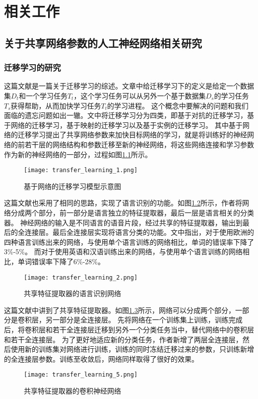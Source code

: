 
\chapter{相关工作}

\section{关于共享网络参数的人工神经网络相关研究}
\subsection{迁移学习的研究}

这篇文献\cite{10.1007/978-3-030-01424-7_27}是一篇关于迁移学习的综述。文章中给迁移学习下的定义是给定一个数据集$D_t$和一个学习任务$T_t$，这个学习任务可以从另外一个基于数据集$D_s$的学习任务$T_s$获得帮助，从而加快学习任务$T_t$的学习进程。
这个概念中要解决的问题和我们面临的遗忘问题如出一辙。文中将迁移学习分为四类，即基于对抗的迁移学习，基于网络的迁移学习，基于映射的迁移学习以及基于实例的迁移学习。
其中基于网络的迁移学习提出了共享网络参数来加快目标网络的学习，就是将训练好的神经网络的前若干层的网络结构和参数迁移至新的神经网络，将这些网络连接和学习参数作为新的神经网络的一部分，过程如图\ref{fig:transfer_learning_1}所示。
\begin{figure}
    \centering
    \texttt{[image: transfer\_learning\_1.png]}
    \caption{基于网络的迁移学习模型示意图\cite{10.1007/978-3-030-01424-7_27}}
    \label{fig:transfer_learning_1}
\end{figure}

这篇文献\cite{6639081}也采用了相同的思路，实现了语言识别的功能。如图\ref{fig:transfer_learning_2}所示，作者将网络分成两个部分，前一部分是语言独立的特征提取器，最后一层是语言相关的分类器。
神经网络的输入是不同语言的语音片段，经过共享的特征提取器，输出到最后的全连接层。最后全连接层实现将语言分类的功能。文中指出，对于使用欧洲的四种语言训练出来的网络，与使用单个语言训练的网络相比，单词的错误率下降了3\%-5\%。
而对于使用英语和汉语训练出来的网络，与使用单个语言训练的网络相比，单词错误率下降了6\%-28\%。
\begin{figure}
    \centering
    \texttt{[image: transfer\_learning\_2.png]}
    \caption{共享特征提取器的语言识别网络\cite{6639081}}
    \label{fig:transfer_learning_2}
\end{figure}

这篇文献\cite{Oquab_2014_CVPR}中讲到了共享特征提取器。如图\ref{fig:transfer_learning_5}所示，网络可以分成两个部分，一部分是卷积层，另一部分是全连接层。
先将网络在一个训练集上训练，训练完成后，将卷积层和若干全连接层迁移到另外一个分类任务当中，替代网络中的卷积层和若干全连接层。
为了更好地适应新的分类任务，作者新增了两层全连接层，然后使用新的训练集对网络进行训练，训练的同时冻结迁移过来的参数，只训练新增的全连接层参数。训练至收敛后，网络同样取得了很好的效果。 
\begin{figure}
    \centering
    \texttt{[image: transfer\_learning\_5.png]}
    \caption{共享特征提取器的卷积神经网络\cite{Oquab_2014_CVPR}}
    \label{fig:transfer_learning_5}
\end{figure}

